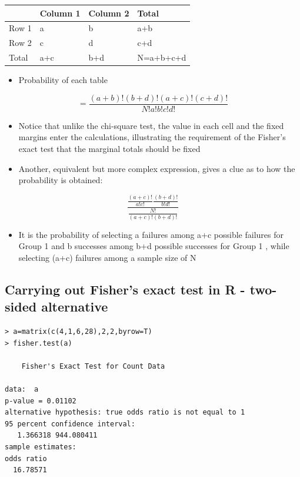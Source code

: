 \documentclass[
]{book}
\providecommand{\tightlist}{%
  \setlength{\itemsep}{0pt}\setlength{\parskip}{0pt}}
\begin{document}
\begin{tabular}{l|l|l|l}
\hline
  & Column 1 & Column 2 & Total\\
\hline
Row 1 & a & b & a+b\\
\hline
Row 2 & c & d & c+d\\
\hline
Total & a+c & b+d & N=a+b+c+d\\
\hline
\end{tabular}

\begin{itemize}
\tightlist
\item
  Probability of each table
\end{itemize}

\[=\frac{(a+b)!(b+d)!(a+c)!(c+d)!}{N!a!b!c!d!}\]

\begin{itemize}
\tightlist
\item
  Notice that unlike the chi-square test, the value in each cell and the fixed margins enter the calculations, illustrating the requirement of the Fisher's exact test that the marginal totals should be fixed
\item
  Another, equivalent but more complex expression, gives a clue as to how the probability is obtained:
\end{itemize}

\[\frac{\frac{(a+c)!}{a!c!}\frac{(b+d)!}{b!d!}}{\frac{N!}{(a+c)!(b+d)!}}\]

\begin{itemize}
\tightlist
\item
  It is the probability of selecting a failures among a+c possible failures for Group 1 and b successes among b+d possible successes for Group 1 , while selecting (a+c) failures among a sample size of N
\end{itemize}

\hypertarget{carrying-out-fishers-exact-test-in-r---two-sided-alternative}{%
\subsection{Carrying out Fisher's exact test in R - two-sided alternative}\label{carrying-out-fishers-exact-test-in-r---two-sided-alternative}}

\begin{verbatim}
> a=matrix(c(4,1,6,28),2,2,byrow=T)
> fisher.test(a)

    Fisher's Exact Test for Count Data

data:  a
p-value = 0.01102
alternative hypothesis: true odds ratio is not equal to 1
95 percent confidence interval:
   1.366318 944.080411
sample estimates:
odds ratio 
  16.78571 
\end{verbatim}
\end{document}
